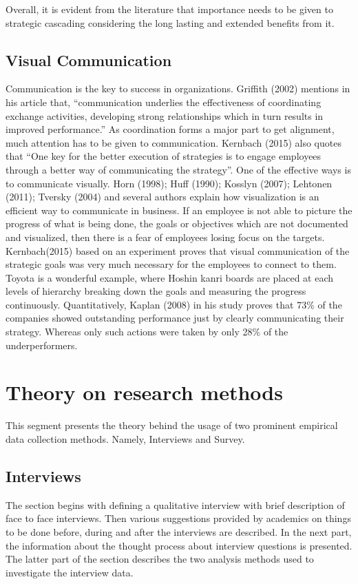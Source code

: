 Overall, it is evident from the literature that importance needs to be given to strategic cascading considering the long lasting and extended benefits from it.


\subsection{Visual Communication}
Communication is the key to success in organizations. Griffith (2002) mentions in his article that, “communication underlies the effectiveness of coordinating exchange activities, developing strong relationships which in turn results in improved performance.'' As coordination forms a major part to get alignment, much attention has to be given to communication. Kernbach (2015) also quotes that “One key for the better execution of strategies is to engage employees through a better way of communicating the strategy”. One of the effective ways is to communicate visually. Horn (1998); Huff (1990); Kosslyn (2007); Lehtonen (2011); Tversky (2004) and several authors explain how visualization is an efficient way to communicate in business. If an employee is not able to picture the progress of what is being done, the goals or objectives which are not documented and visualized, then there is a fear of employees losing focus on the targets.\\

Kernbach(2015) based on an experiment proves that visual communication of the strategic goals was very much necessary for the employees to connect to them. Toyota is a wonderful example, where Hoshin kanri boards are placed at each levels of hierarchy breaking down the goals and measuring the progress continuously. Quantitatively, Kaplan (2008) in his study proves that 73\% of the companies showed outstanding performance just by clearly communicating their strategy. Whereas only such actions were taken by only 28\% of the underperformers.
\\

\section{Theory on research methods}

This segment presents the theory behind the usage of two prominent empirical data collection methods. Namely, Interviews and Survey.

\subsection{Interviews}
The section begins with defining a qualitative interview with brief description of face to face interviews. Then various suggestions provided by academics on things to be done before, during and after the interviews are described. In the next part, the information about the thought process about interview questions is presented. The latter part of the section describes the two analysis methods used to investigate the interview data. \\

